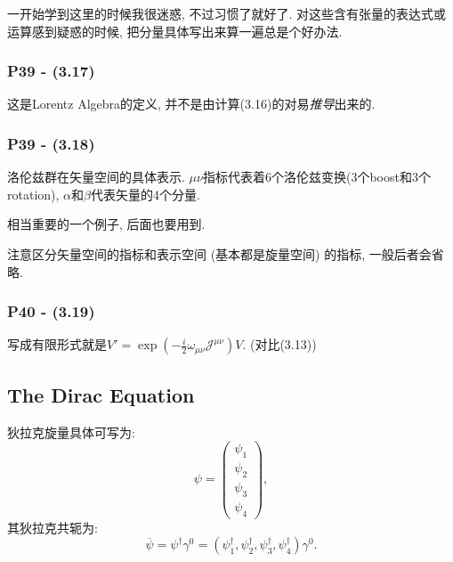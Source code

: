 \documentclass[cn,hazy,blue,11pt,device=normal,chinesefont=founder]{elegantnote}
\begin{document}
\begin{remark}
  一开始学到这里的时候我很迷惑, 不过习惯了就好了. 对这些含有张量的表达式或运算感到疑惑的时候, 把分量具体写出来算一遍总是个好办法. 
\end{remark}

\subsubsection{P39 - (3.17)}

这是Lorentz Algebra的定义, 并不是由计算(3.16)的对易\textit{推导}出来的. 

\subsubsection{P39 - (3.18)}

洛伦兹群在矢量空间的具体表示. $\mu\nu$指标代表着6个洛伦兹变换(3个boost和3个rotation), $\alpha$和$\beta$代表矢量的4个分量. 

相当重要的一个例子, 后面也要用到. 
\begin{remark}
  注意区分矢量空间的指标和表示空间 (基本都是旋量空间) 的指标, 一般后者会省略. 
\end{remark}

\subsubsection{P40 - (3.19)}

写成有限形式就是$V' = \exp{(-\frac{i}{2}\omega_{\mu\nu}\mathcal{J}^{\mu\nu})}V$. (对比(3.13))

\subsection{The Dirac Equation}

\begin{note}
  狄拉克旋量具体可写为:  
  \begin{equation}
    \psi = \left( \begin{array}{c} \psi_1 \\ \psi_2 \\ \psi_3 \\ \psi_4 \end{array} \right), 
  \end{equation}
  其狄拉克共轭为: 
  \begin{equation}
    \overline{\psi} = \psi^\dagger \gamma^0 = (\psi^\dagger_1, \psi^\dagger_2, \psi^\dagger_3, \psi^\dagger_4)\gamma^0. 
  \end{equation}
\end{note}
\end{document}
